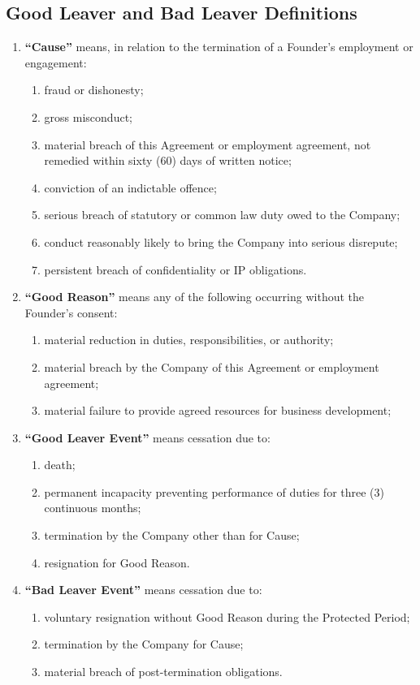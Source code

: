 \subsection{Good Leaver and Bad Leaver Definitions}
\begin{enumerate}[label=(\alph*)]
\item \textbf{``Cause''} means, in relation to the termination of a Founder's employment or engagement:
    \begin{enumerate}[label=(\roman*)]
    \item fraud or dishonesty;
    \item gross misconduct;
    \item material breach of this Agreement or employment agreement, not remedied within sixty (60) days of written notice;
    \item conviction of an indictable offence;
    \item serious breach of statutory or common law duty owed to the Company;
    \item conduct reasonably likely to bring the Company into serious disrepute;
    \item persistent breach of confidentiality or IP obligations.
    \end{enumerate}

\item \textbf{``Good Reason''} means any of the following occurring without the Founder's consent:
    \begin{enumerate}[label=(\roman*)]
    \item material reduction in duties, responsibilities, or authority;
    \item material breach by the Company of this Agreement or employment agreement;
    \item material failure to provide agreed resources for business development;
    \end{enumerate}

\item \textbf{``Good Leaver Event''} means cessation due to:
    \begin{enumerate}[label=(\roman*)]
    \item death;
    \item permanent incapacity preventing performance of duties for three (3) continuous months;
    \item termination by the Company other than for Cause;
    \item resignation for Good Reason.
    \end{enumerate}

\item \textbf{``Bad Leaver Event''} means cessation due to:
    \begin{enumerate}[label=(\roman*)]
    \item voluntary resignation without Good Reason during the Protected Period;
    \item termination by the Company for Cause;
    \item material breach of post-termination obligations.
    \end{enumerate}
\end{enumerate}


